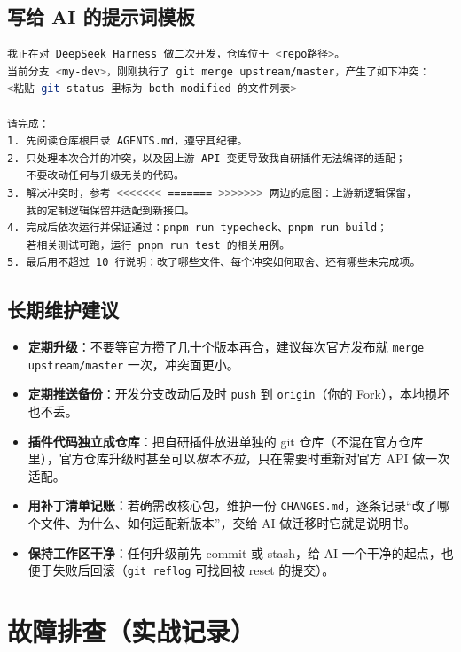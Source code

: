 \documentclass[11pt]{ctexart}
\newcommand{\code}[1]{\texttt{\small #1}}
\begin{document}
\subsection{写给 AI 的提示词模板}

\begin{lstlisting}[language=bash]
我正在对 DeepSeek Harness 做二次开发，仓库位于 <repo路径>。
当前分支 <my-dev>，刚刚执行了 git merge upstream/master，产生了如下冲突：
<粘贴 git status 里标为 both modified 的文件列表>

请完成：
1. 先阅读仓库根目录 AGENTS.md，遵守其纪律。
2. 只处理本次合并的冲突，以及因上游 API 变更导致我自研插件无法编译的适配；
   不要改动任何与升级无关的代码。
3. 解决冲突时，参考 <<<<<<< ======= >>>>>>> 两边的意图：上游新逻辑保留，
   我的定制逻辑保留并适配到新接口。
4. 完成后依次运行并保证通过：pnpm run typecheck、pnpm run build；
   若相关测试可跑，运行 pnpm run test 的相关用例。
5. 最后用不超过 10 行说明：改了哪些文件、每个冲突如何取舍、还有哪些未完成项。
\end{lstlisting}

\subsection{长期维护建议}

\begin{itemize}[itemsep=1pt]
  \item \textbf{定期升级}：不要等官方攒了几十个版本再合，建议每次官方发布就 \code{merge upstream/master} 一次，冲突面更小。
  \item \textbf{定期推送备份}：开发分支改动后及时 \code{push} 到 \code{origin}（你的 Fork），本地损坏也不丢。
  \item \textbf{插件代码独立成仓库}：把自研插件放进单独的 git 仓库（不混在官方仓库里），官方仓库升级时甚至可以\emph{根本不拉}，只在需要时重新对官方 API 做一次适配。
  \item \textbf{用补丁清单记账}：若确需改核心包，维护一份 \code{CHANGES.md}，逐条记录“改了哪个文件、为什么、如何适配新版本”，交给 AI 做迁移时它就是说明书。
  \item \textbf{保持工作区干净}：任何升级前先 commit 或 stash，给 AI 一个干净的起点，也便于失败后回滚（\code{git reflog} 可找回被 reset 的提交）。
\end{itemize}

\section{故障排查（实战记录）}
\end{document}
